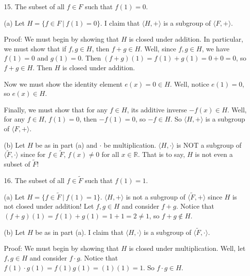 \documentclass{article}
\begin{document}
15. The subset of all $f \in F$ such that $f(1) = 0$.
\newline

(a) Let $H = \{f \in F \: | \: f(1) = 0\}$. I claim that $\langle H, + \rangle$ is a subgroup of $\langle F, + \rangle$. 
\newline

Proof: We must begin by showing that $H$ is closed under addition. In particular, we must show that if $f, g \in H$, then $f + g \in H$. Well, since $f, g \in H$, we have $f(1) = 0$ and $g(1) = 0$. Then $(f + g)(1) = f(1) + g(1) = 0 + 0 = 0$, so $f + g \in H$. Then $H$ is closed under addition. 
\newline

Now we must show the identity element $e(x) = 0 \in H$. Well, notice $e(1) = 0$, so $e(x) \in H$. 
\newline

Finally, we must show that for any $f \in H$, its additive inverse $-f(x) \in H$. Well, for any $f \in H$, $f(1) = 0$, then $-f(1) = 0$, so $-f \in H$. So $\langle H, + \rangle$ is a subgroup of $\langle F, + \rangle$.
\newline

(b) Let $H$ be as in part (a) and $\cdot$ be multiplication. $\langle H, \cdot \rangle$ is NOT a subgroup of $\langle \tilde{F}, \cdot \rangle$ since for $f \in \tilde{F}$, $f(x) \neq 0$ for all $x \in \mathbb{R}$. That is to say, $H$ is not even a subset of $\tilde{F}$!
\newline


16. The subset of all $f \in \tilde{F}$ such that $f(1) = 1$.
\newline

(a) Let $H = \{f \in \tilde{F} \: | \: f(1) = 1\}$. $\langle H, + \rangle$ is not a subgroup of $\langle \tilde{F}, + \rangle$ since $H$ is not closed under addition! Let $f, g \in H$ and consider $f + g$. Notice that $(f + g)(1) = f(1) + g(1) = 1 + 1 = 2 \neq 1$, so $f + g \notin H$.
\newline

(b) Let $H$ be as in part (a). I claim that $\langle H, \cdot \rangle$ is a subgroup of $\langle \tilde{F}, \cdot \rangle$.
\newline

Proof: We must begin by showing that $H$ is closed under multiplication. Well, let $f, g \in H$ and consider $f \cdot g$. Notice that $f(1) \cdot g(1) = f(1)g(1) = (1)(1) = 1$. So $f \cdot g \in H$.
\newline
\end{document}
